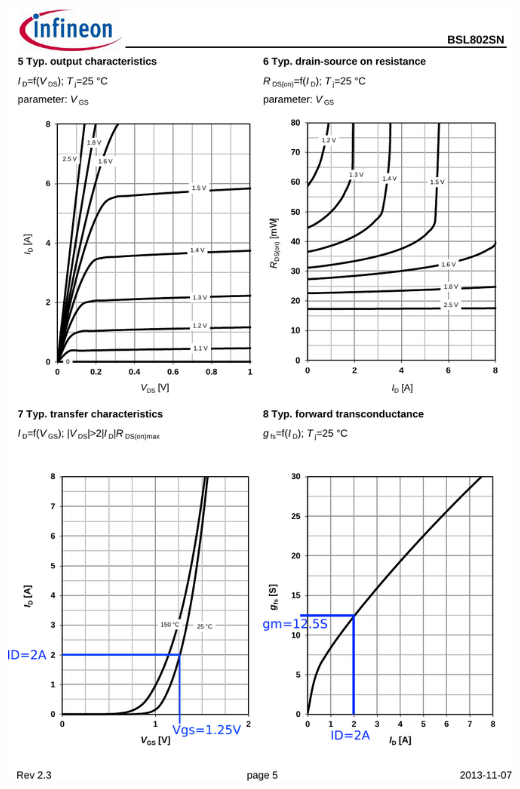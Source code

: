 \documentclass{../template/tp}
\begin{document}
\begin{center}
{\includegraphics[width=15cm]{Infineon-BSL802SN-DS-v01_00-en_corr.pdf}}
{\vspace{-1cm}
}
\end{center}
\end{document}
